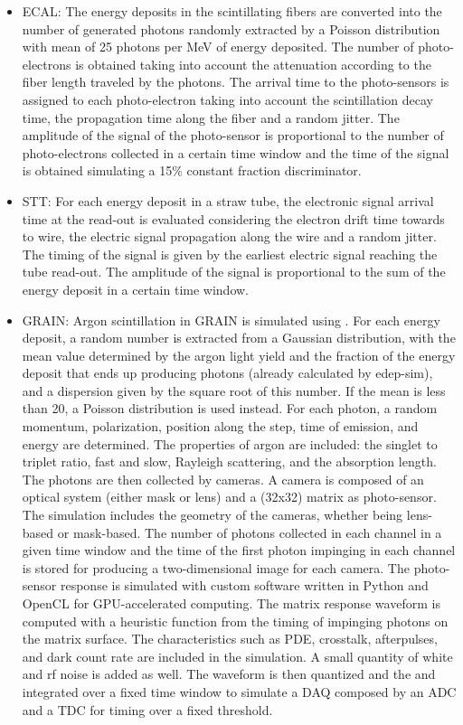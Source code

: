 \documentclass[../main-v1.tex]{subfiles}
\begin{document}
 \begin{itemize}
\item{ECAL:} The energy deposits in the scintillating fibers are converted into the number of generated photons randomly extracted by a Poisson distribution with mean of 25 photons per MeV of energy deposited. The number of photo-electrons is obtained taking into account the attenuation according to the fiber length traveled by the photons. The arrival time to the photo-sensors is assigned to each photo-electron taking into account the scintillation decay time, the propagation time along the fiber and a random jitter. The amplitude of the signal of the photo-sensor is proportional to the number of photo-electrons collected in a certain time window and the time of the signal is obtained simulating a 15\% constant fraction discriminator.
 
\item{STT:} For each energy deposit in a straw tube, the electronic signal arrival time at the read-out is evaluated considering the electron drift time towards to wire, the electric signal propagation along the wire and a random jitter. The timing of the signal is given by the earliest electric signal reaching the tube read-out. The amplitude of the signal is proportional to the sum of the energy deposit in a certain time window.
 
\item{GRAIN:} Argon scintillation in GRAIN is simulated using . For each energy deposit, a random number is extracted from a Gaussian distribution, with the mean value determined by the argon light yield and the fraction of the energy deposit that ends up producing photons (already calculated by edep-sim), and a dispersion given by the square root of this number. If the mean is less than 20, a Poisson distribution is used instead. For each photon, a random momentum, polarization, position along the step, time of emission, and energy are determined. The properties of argon are included: the singlet to triplet ratio, fast and slow, Rayleigh scattering, and the absorption length.
The photons are then collected by cameras. A camera is composed of an optical system (either mask or lens) and a (32x32)  matrix as photo-sensor. The simulation includes the geometry of the cameras, whether being lens-based or mask-based. The number of photons collected in each channel in a given time window and the time of the first photon impinging in each channel is stored for producing a two-dimensional image for each camera. 
The photo-sensor response is simulated with custom software written in Python and OpenCL for GPU-accelerated computing. The  matrix response waveform is computed with a heuristic function from the timing of impinging photons on the matrix surface. The  characteristics such as PDE, crosstalk, afterpulses, and dark count rate are included in the simulation. A small quantity of white and rf noise is added as well. The waveform is then quantized and the and integrated over a fixed time window to simulate a DAQ composed by an ADC and a TDC for timing over a fixed threshold.
\end{itemize}
\end{document}
